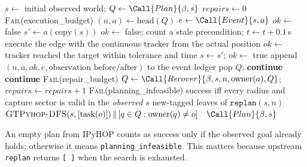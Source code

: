 \begin{algorithm}[!tbp]
\caption{Observed-state recovery actor (\texttt{run\_trial}); $\beta$ is the back-end}
\label{alg:recovery-actor}
\begin{algorithmic}[1]
  \State $s \gets$ initial observed world; $Q \gets \Call{Plan}{\beta, s}$ 
  \State $\mathit{repairs}\gets 0$
      \State \Return \textsc{Fail}(execution\_budget)
    \EndIf
    \State $(n, a) \gets \mathrm{head}(Q)$
    \State $e \gets \Call{Event}{s, a}$ 
     \State $\mathit{ok}\gets$ false 
    \Else
      \State $s' \gets a(\mathrm{copy}(s))$ 
       \State $\mathit{ok}\gets$ false; count a stale precondition; $t \gets t+0.1$\,s
       \State execute the edge with the continuous tracker from the actual position
      \State $\mathit{ok}\gets$ tracker reached the target within tolerance and time
      \Else \State $s\gets s'$; $\mathit{ok}\gets$ true
      \EndIf
    \EndIf
    \State append $(n, a, \mathit{ok}, e, \text{observation before/after})$ to the event ledger
     pop $Q$; \textbf{continue} \EndIf
     \textbf{continue} 
    \EndIf
     \Return \textsc{Fail}(repair\_budget) \EndIf
    \State $Q \gets \Call{Recover}{\beta, s, n, \mathrm{owner}(a), Q}$; $\mathit{repairs}\gets\mathit{repairs}+1$
     \Return \textsc{Fail}(planning\_infeasible) \EndIf
  \EndWhile
  \State \Return success iff every radius and capture sector is valid in the \emph{observed} $s$
\EndFunction
\Statex
{}
   \Return new-tagged leaves of $\texttt{replan}(s, n)$ 
   \Return $\textsc{GTPyhop-DFS}(s, [\mathrm{task}(o)]) \,\Vert\, [q\in Q : \mathrm{owner}(q)\neq o]$
  \Else \ \Return $\Call{Plan}{\beta, s}$ 
  \EndIf
\EndFunction
\end{algorithmic}
\end{algorithm}
\noindent An empty plan from IPyHOP counts as success only if the observed goal already holds; otherwise
it means \texttt{planning\_infeasible}. This matters because upstream \texttt{replan} returns
\texttt{[\,]} when the search is exhausted.

